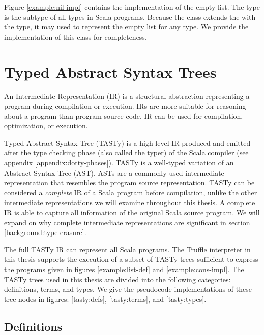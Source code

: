 Figure \ref{example:nil-impl} contains the implementation of the empty list. 
The  type is the subtype of all types in Scala programs.
Because the  class extends the  with the  type, it may used to represent the empty list for any type.
We provide the implementation of this class for completeness.

\section{Typed Abstract Syntax Trees}

An Intermediate Representation (IR) is a structural abstraction representing a program during compilation or execution. 
IRs are more suitable for reasoning about a program than program source code. 
IR can be used for compilation\cite{llvm}, optimization\cite{llvm,ssa}, or execution\cite{java:vm-spec,clr:spec}.

Typed Abstract Syntax Tree (TASTy) is a high-level IR produced and emitted after the type checking phase (also called the typer) of the Scala compiler (see appendix \ref{appendix:dotty-phases}).
TASTy is a well-typed variation of an Abstract Syntax Tree (AST).
ASTs are a commonly used intermediate representation that resembles the program source representation.
TASTy can be considered a \textit{complete} IR of a Scala program before compilation, unlike the other intermediate representations we will examine throughout this thesis.
A complete IR is able to capture all information of the original Scala source program.
We will expand on why complete intermediate representations are significant in section \ref{background:type-erasure}.

The full TASTy IR can represent all Scala programs.
The Truffle interpreter in this thesis supports the execution of a subset of TASTy trees sufficient to express the programs given in figures \ref{example:list-def} and \ref{example:cons-impl}.
The TASTy trees used in this thesis are divided into the following categories: definitions, terms, and types. 
We give the pseudocode implementations of these tree nodes in figures: \ref{tasty:defs}, \ref{tasty:terms}, and \ref{tasty:types}.

\subsection{Definitions}

